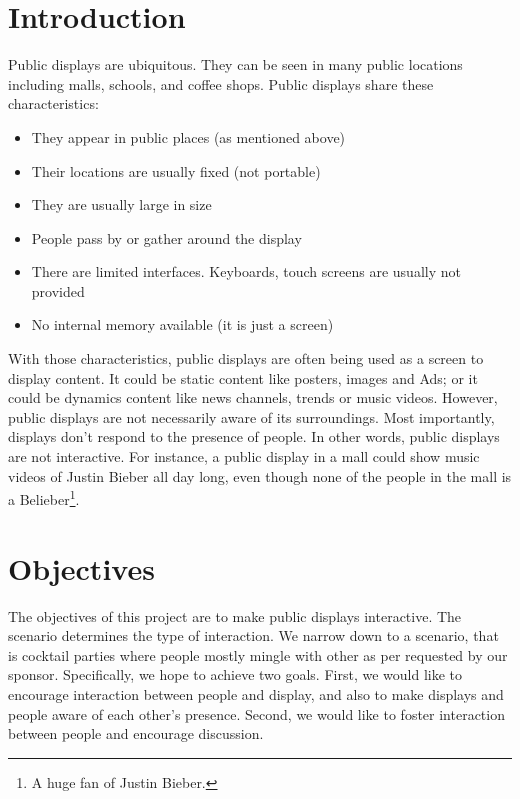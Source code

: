 \documentclass{sig-alternate}
\begin{document}

\maketitle
{}

\section{Introduction}
Public displays are ubiquitous. They can be seen in many public locations including malls, schools, and coffee shops. Public displays share these characteristics:
\begin{itemize}
	\item They appear in public places (as mentioned above)
	\item Their locations are usually fixed (not portable)
	\item They are usually large in size
	\item People pass by or gather around the display
	\item There are limited interfaces. Keyboards, touch screens are usually not provided
	\item No internal memory available (it is just a screen)
\end{itemize}

With those characteristics, public displays are often being used as a screen to display content. It could be static content like posters, images and Ads; or it could be dynamics content like news channels, trends or music videos. However, public displays are not necessarily aware of its surroundings. Most importantly, displays don't respond to the presence of people. In other words, public displays are not interactive. For instance, a public display in a mall could show music videos of Justin Bieber all day long, even though none of the people in the mall is a Belieber\footnote{A huge fan of Justin Bieber.}.

\section{Objectives}
The objectives of this project are to make public displays interactive. The scenario determines the type of interaction. We narrow down to a scenario, that is cocktail parties where people mostly mingle with other as per requested by our sponsor. Specifically, we hope to achieve two goals. First, we would like to encourage interaction between people and display, and also to make displays and people aware of each other's presence. Second, we would like to foster interaction between people and encourage discussion.
\end{document}
